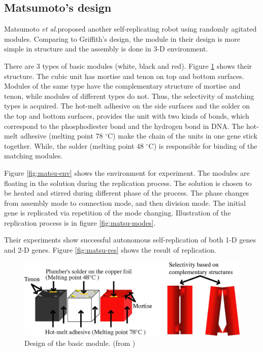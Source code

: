 \documentclass[12pt,twoside]{article}
\theoremstyle{plain}
\theoremstyle{definition}
\theoremstyle{remark}
\newcommand{\etal}{\textit{et al.}}
\begin{document}
\subsection{Matsumoto's design}
Matsumoto \etal proposed another self-replicating robot using randomly agitated modules\cite{matsumoto_passive_2009}. Comparing to Griffith's design, the module in their design is more simple in structure and the assembly is done in 3-D environment.

There are 3 types of basic modules (white, black and red). Figure \ref{fig:matsu-mod} shows their structure. The cubic unit has mortise and tenon on top and bottom surfaces. Modules of the same type have the complementary structure of mortise and tenon, while modules of different types do not. Thus, the selectivity of matching types is acquired. The hot-melt adhesive on the side surfaces and the solder on the top and bottom surfaces, provides the unit with two kinds of bonds, which correspond to the phosphodiester bond and the hydrogen bond in DNA. The hot-melt adhesive (melting point 78 $^\circ$C) make the chain of the units in one gene stick together. While, the solder (melting point 48 $^\circ$C) is responsible for binding of the matching modules.

Figure \ref{fig:matsu-env} shows the environment for experiment. The modules are floating in the solution during the replication process. The solution is chosen to be heated and stirred during different phase of the process. The phase changes from assembly mode to connection mode, and then division mode. The initial gene is replicated via repetition of the mode changing. Illustration of the replication process is in figure \ref{fig:matsu-modes}. 

Their experiments show successful autonomous self-replication of both 1-D genes and 2-D genes. Figure \ref{fig:matsu-res} shows the result of replication.

\begin{figure}[t]
	 \centerline{\includegraphics[width=.7\textwidth]{matsu-001}}
	 {\caption{Design of the basic module. (from \cite{matsumoto_passive_2009})}
	 \label{fig:matsu-mod}}
\end{figure}
\end{document}
